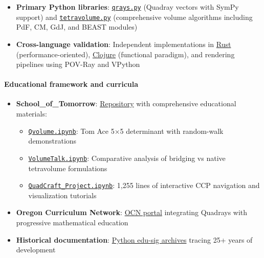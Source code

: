 \documentclass[
  10pt,
]{article}
\providecommand{\tightlist}{%
  \setlength{\itemsep}{0pt}\setlength{\parskip}{0pt}}
\begin{document}
\begin{itemize}
\tightlist
\item
  \textbf{Primary Python libraries}:
  \href{https://github.com/4dsolutions/m4w/blob/main/qrays.py}{\texttt{qrays.py}}
  (Quadray vectors with SymPy support) and
  \href{https://github.com/4dsolutions/m4w/blob/main/tetravolume.py}{\texttt{tetravolume.py}}
  (comprehensive volume algorithms including PdF, CM, GdJ, and BEAST
  modules)
\item
  \textbf{Cross-language validation}: Independent implementations in
  \href{https://github.com/4dsolutions/rusty_rays}{Rust}
  (performance-oriented),
  \href{https://github.com/4dsolutions/synmods}{Clojure} (functional
  paradigm), and rendering pipelines using POV-Ray and VPython
\end{itemize}

\hypertarget{educational-framework-and-curricula-1}{%
\paragraph{Educational framework and
curricula}\label{educational-framework-and-curricula-1}}

\begin{itemize}
\tightlist
\item
  \textbf{School\_of\_Tomorrow}:
  \href{https://github.com/4dsolutions/School_of_Tomorrow}{Repository}
  with comprehensive educational materials:

  \begin{itemize}
  \tightlist
  \item
    \href{https://github.com/4dsolutions/School_of_Tomorrow/blob/master/Qvolume.ipynb}{\texttt{Qvolume.ipynb}}:
    Tom Ace 5×5 determinant with random-walk demonstrations
  \item
    \href{https://github.com/4dsolutions/School_of_Tomorrow/blob/master/VolumeTalk.ipynb}{\texttt{VolumeTalk.ipynb}}:
    Comparative analysis of bridging vs native tetravolume formulations
  \item
    \href{https://github.com/4dsolutions/School_of_Tomorrow/blob/master/QuadCraft_Project.ipynb}{\texttt{QuadCraft\_Project.ipynb}}:
    1,255 lines of interactive CCP navigation and visualization
    tutorials
  \end{itemize}
\item
  \textbf{Oregon Curriculum Network}:
  \href{http://www.4dsolutions.net/ocn/}{OCN portal} integrating
  Quadrays with progressive mathematical education
\item
  \textbf{Historical documentation}:
  \href{https://mail.python.org/pipermail/edu-sig/2000-May/000498.html}{Python
  edu-sig archives} tracing 25+ years of development
\end{itemize}
\end{document}
